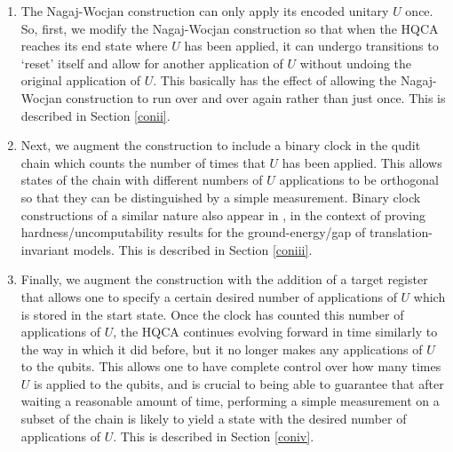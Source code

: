 \documentclass[11pt,letterpaper]{article}
\newcommand{\<}{\langle}
\renewcommand{\>}{\rangle}
\begin{document}
\begin{enumerate}

\item The Nagaj-Wocjan construction can only apply its encoded unitary $U$ once. So, first, we modify the Nagaj-Wocjan construction so that when the HQCA reaches its end state where $U$ has been applied, it can undergo transitions to `reset' itself and allow for another application of $U$ without undoing the original application of $U$. This basically has the effect of allowing the Nagaj-Wocjan construction to run over and over again rather than just once. This is described in Section \ref{conii}. 

\item Next, we augment the construction to include a binary clock in the qudit chain which counts the number of times that $U$ has been applied. This allows states of the chain with different numbers of $U$ applications to be orthogonal so that they can be distinguished by a simple measurement. Binary clock constructions of a similar nature also appear in \cite{AGIK,GI,CPGW}, in the context of proving hardness/uncomputability results for the ground-energy/gap of translation-invariant models. This is described in Section \ref{coniii}.

\item Finally, we augment the construction with the addition of a target register that allows one to specify a certain desired number of applications of $U$ which is stored in the start state. Once the clock has counted this number of applications of $U$, the HQCA continues evolving forward in time similarly to the way in which it did before, but it no longer makes any applications of $U$ to the qubits. This allows one to have complete control over how many times $U$ is applied to the qubits, and is crucial to being able to guarantee that after waiting a reasonable amount of time, performing a simple measurement on a subset of the chain is likely to yield a state with the desired number of applications of $U$. This is described in Section \ref{coniv}.
\end{enumerate}

\end{document}
